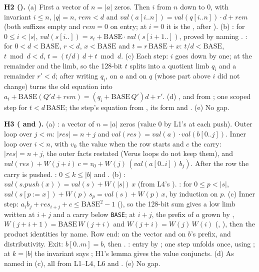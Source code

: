\documentclass[11pt]{article}
\begin{document}
\begin{answer}
\textbf{H2 ().}
(a) First a vector  of $n = |a|$ zeros. Then $i$ from $n$ down to 0,
with invariant $i \le n$, $|q| = n$, $\mathit{rem} < d$ and
$\mathit{val}(a[i..n]) = \mathit{val}(q[i..n]) \cdot d + \mathit{rem}$ (both
suffixes empty and $\mathit{rem} = 0$ on entry; at $i = 0$ it is the
, after ).
(b) : for $0 \le i < |s|$,
$\mathit{val}(s[i..]) = s_i + \mathrm{BASE}\cdot\mathit{val}(s[i + 1..])$,
proved by naming .
: for $0 < d < \mathrm{BASE}$, $r < d$,
$x < \mathrm{BASE}$ and $t = r\,\mathrm{BASE} + x$: $t / d < \mathrm{BASE}$,
$t \bmod d < d$, $t = (t / d)\,d + t \bmod d$.
(c) Each step: $i$ goes down by one;  at the remainder and the
limb, so the 128-bit $t$ splits into a quotient limb $q_i$ and a remainder
$r' < d$; after writing $q_i$,  on $a$ and on $q$ (whose part
above $i$ did not change) turns the old equation into
$a_i + \mathrm{BASE}(Q' d + \mathit{rem}) = (q_i + \mathrm{BASE}\,Q') d + r'$.
(d) ,  and
 from ; one scoped
 step for $t < d\,\mathrm{BASE}$; the step's equation from
, its  form and
.
(e) No gap.

\textbf{H3 ( and ).}
(a) : a vector of $n = |a|$ zeros (value 0 by L1's
 at each push). Outer loop over $j < m$:
$|res| = n + j$ and $\mathit{val}(res) = \mathit{val}(a)\cdot\mathit{val}(b[0..j])$.
Inner loop over $i < n$, with $v_0$ the value when the row starts and $c$
the carry: $|res| = n + j$, the outer facts restated (Verus loops do not keep
them), and $\mathit{val}(res) + W(j + i)\,c = v_0 +
W(j)\,(\mathit{val}(a[0..i])\, b_j)$. After the row the carry is pushed.
: $0 \le k \le |b|$ and .
(b) : $\mathit{val}(s.push(x)) = \mathit{val}(s) + W(|s|)\,x$
(from L4's ). : for
$0 \le p < |s|$, $\mathit{val}(s[p := x]) + W(p)\,s_p = \mathit{val}(s) + W(p)\,x$,
by induction on $p$.
(c) Inner step: $a_i b_j + res_{i+j} + c \le \mathrm{BASE}^2 - 1$
(), so the 128-bit sum gives a low limb written at
$i + j$ and a carry below \texttt{BASE};  at $i + j$, the
prefix of $a$ grown by , $W(j + i + 1) = \mathrm{BASE}\,W(j + i)$
and $W(j + i) = W(j)\,W(i)$ (, ),
then the product identities by name. Row end:  on the vector
and on $b$'s prefix, and distributivity. Exit: $b[0..m] = b$, then
. : entry by ; one step unfolds
 once, using ; at $k = |b|$ the
invariant says ; H1's lemma gives the value conjuncts.
(d) As named in (c), all from L1--L4, L6 and .
(e) No gap.
\end{answer}
\end{document}
